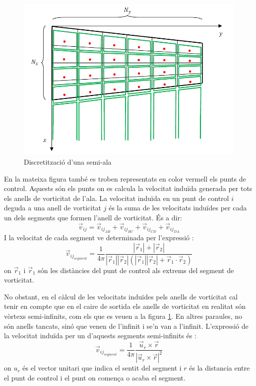 \begin{figure}[h]
	\centering
	\includegraphics[scale=0.5]{./plots/discretitzacio}
	\caption{Discretització d'una semi-ala \cite{LizandraDalmases2017b}}
	\label{discretit}
\end{figure}

En la mateixa figura també es troben representats en color vermell els punts de control. Aquests són els punts on es calcula la velocitat induïda generada per tots els anells de vorticitat de l'ala. La velocitat induïda en un punt de control $i$ deguda a una anell de vorticitat $j$ és la suma de les velocitats induïdes per cada un dels segments que formen l'anell de vorticitat. És a dir:
\begin{equation}
\vec{v}_{ij}=\vec{v}_{ij_{AB}}+\vec{v}_{ij_{BC}}+\vec{v}_{ij_{CD}}+\vec{v}_{ij_{DA}}
\end{equation}
I la velocitat de cada segment ve determinada per l'expressió \cite{LizandraDalmases2017}:
\begin{equation}
\vec{v}_{ij_{segment}}=\frac{1}{4\pi}\frac{|\vec{r}_{1}|+|\vec{r}_{2}|}{|\vec{r}_{1}||\vec{r}_{2}|(|\vec{r}_{1}||\vec{r}_{2}|+\vec{r}_{1}\cdot\vec{r}_{2})}
\end{equation}
on $\vec{r}_{1}$ i $\vec{r}_{1}$ són les distàncies del punt de control als extrems del segment de vorticitat.

No obstant, en el càlcul de les velocitats induïdes pels anells de vorticitat cal tenir en compte que en el caire de sortida els anells de vorticitat en realitat són vòrtexs semi-infinits, com els que es veuen a la figura \ref{discretit}. En altres paraules, no són anells tancats, sinó que venen de l'infinit i se'n van a l'infinit. L'expressió de la velocitat induïda per un d'aquests segments semi-infinits és \cite{LizandraDalmases2017}:
\begin{equation}
\vec{v}_{ij_{segment}}=\frac{1}{4\pi}\frac{\vec{u}_{r}\times\vec{r}}{|\vec{u}_{r}\times\vec{r}|^{2}}
\end{equation}
on $u_{r}$ és el vector unitari que indica el sentit del segment i $r$ és la distancia entre el punt de control i el punt on comença o acaba el segment.

